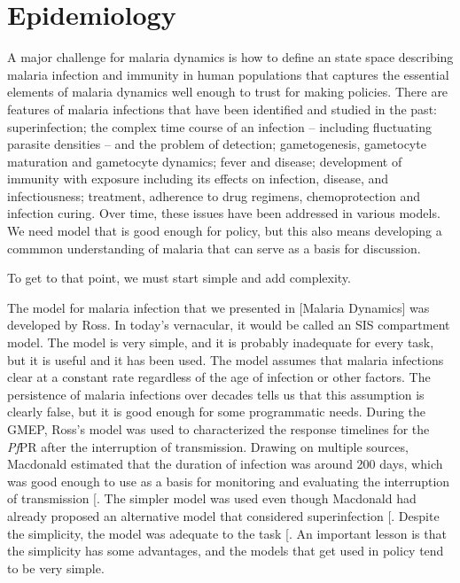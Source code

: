 \documentclass[
]{book}
\begin{document}
\section{Epidemiology}\label{epidemiology}

A major challenge for malaria dynamics is how to define an state space describing malaria infection and immunity in human populations that captures the essential elements of malaria dynamics well enough to trust for making policies.
There are features of malaria infections that have been identified and studied in the past: superinfection; the complex time course of an infection -- including fluctuating parasite densities -- and the problem of detection; gametogenesis, gametocyte maturation and gametocyte dynamics; fever and disease; development of immunity with exposure including its effects on infection, disease, and infectiousness; treatment, adherence to drug regimens, chemoprotection and infection curing. Over time, these issues have been addressed in various models.
We need model that is good enough for policy, but this also means developing a commmon understanding of malaria that can serve as a basis for discussion.

To get to that point, we must start simple and add complexity.

The model for malaria infection that we presented in {[}Malaria Dynamics{]} was developed by Ross. In today's vernacular, it would be called an SIS compartment model. The model is very simple, and it is probably inadequate for every task, but it is useful and it has been used. The model assumes that malaria infections clear at a constant rate regardless of the age of infection or other factors. The persistence of malaria infections over decades tells us that this assumption is clearly false, but it is good enough for some programmatic needs. During the GMEP, Ross's model was used to characterized the response timelines for the \emph{Pf}PR after the interruption of transmission. Drawing on multiple sources, Macdonald estimated that the duration of infection was around 200 days, which was good enough to use as a basis for monitoring and evaluating the interruption of transmission {[}\citeproc{ref-MacdonaldG1964MalariaParasite}{74}{]}. The simpler model was used even though Macdonald had already proposed an alternative model that considered superinfection {[}\citeproc{ref-MacdonaldG1950Superinfection}{60}{]}. Despite the simplicity, the model was adequate to the task {[}\citeproc{ref-SmithDL2009EndemicityResponse}{75}{]}. An important lesson is that the simplicity has some advantages, and the models that get used in policy tend to be very simple.
\end{document}
